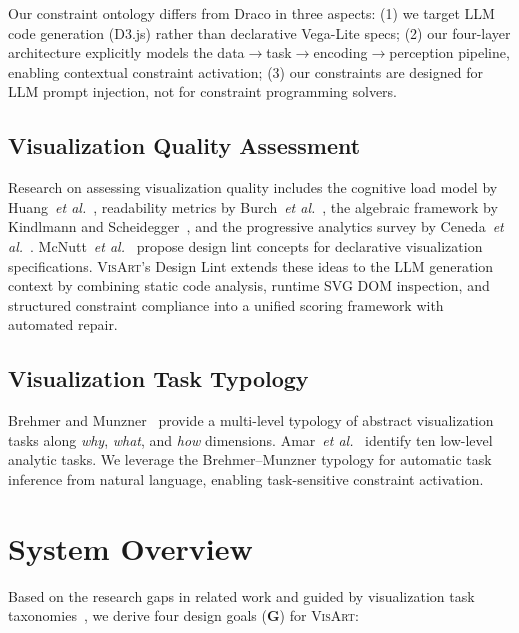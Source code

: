 \documentclass[final,5p,times,twocolumn]{elsarticle}
\newcommand{\sysname}{\textsc{VisArt}}
\newcommand{\etal}{\textit{et al.}}
\begin{document}
Our constraint ontology differs from Draco in three aspects:
(1) we target LLM code generation (D3.js) rather than declarative Vega-Lite specs;
(2) our four-layer architecture explicitly models the data$\to$task$\to$encoding$\to$perception pipeline, enabling contextual constraint activation;
(3) our constraints are designed for LLM prompt injection, not for constraint programming solvers.

\subsection{Visualization Quality Assessment}

Research on assessing visualization quality includes the cognitive load model by Huang~\etal{}~\cite{huang2009measuring}, readability metrics by Burch~\etal{}~\cite{burch2011evaluation}, the algebraic framework by Kindlmann and Scheidegger~\cite{kindlmann2014algebraic}, and the progressive analytics survey by Ceneda~\etal{}~\cite{ceneda2019guide}.
McNutt~\etal{}~\cite{mcnutt2024bavisitter} propose design lint concepts for declarative visualization specifications.
\sysname{}'s Design Lint extends these ideas to the LLM generation context by combining static code analysis, runtime SVG DOM inspection, and structured constraint compliance into a unified scoring framework with automated repair.

\subsection{Visualization Task Typology}

Brehmer and Munzner~\cite{brehmer2013multi} provide a multi-level typology of abstract visualization tasks along \textit{why}, \textit{what}, and \textit{how} dimensions.
Amar~\etal{}~\cite{amar2005low} identify ten low-level analytic tasks.
We leverage the Brehmer--Munzner typology for automatic task inference from natural language, enabling task-sensitive constraint activation.


\section{System Overview}
\label{sec:overview}

Based on the research gaps in related work and guided by visualization task taxonomies~\cite{brehmer2013multi,amar2005low}, we derive four design goals (\textbf{G}) for \sysname{}:
\end{document}
